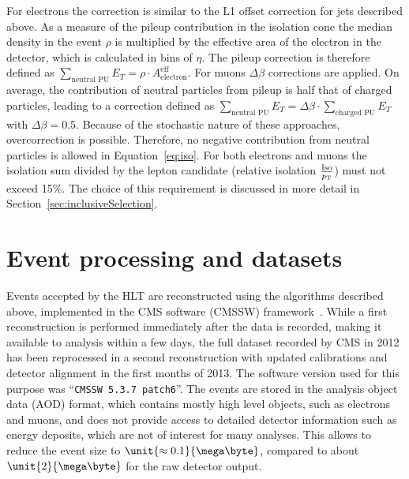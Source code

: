 For electrons the correction is similar to the L1 offset correction for jets described above. As a measure of the pileup contribution in the isolation cone the median \pt density in the event $\rho$ is multiplied by the effective area of the electron in the detector, which is calculated in bins of $\eta$. The pileup correction is therefore defined as $\sum\limits_{\text{neutral PU}} E_T = \rho\cdot A^{\text{eff}}_{\text{electron}}$. For muons $\Delta \beta$ corrections are applied. On average, the contribution of neutral particles from pileup is half that of charged particles, leading to a correction defined as $\sum\limits_{\text{neutral PU}} E_T = \Delta\beta\cdot \sum\limits_{\text{charged PU}} E_T$ with $\Delta\beta = 0.5$. Because of the stochastic nature of these approaches, overcorrection is possible. Therefore, no negative contribution from neutral particles is allowed in Equation~\ref{eq:iso}. For both electrons and muons the isolation sum divided by the lepton candidate \pt (relative isolation $\frac{\text{Iso}}{p_{\mathrm{T}}}$) must not exceed  15\%. The choice of this requirement is discussed in more detail in Section~\ref{sec:inclusiveSelection}.

 
\section{Event processing and datasets}
Events accepted by the HLT are reconstructed using the algorithms described above, implemented in the CMS software (CMSSW) framework~\cite{PTDR1,SWGuideCMSSW}. While a first reconstruction is performed immediately after the data is recorded, making it available to analysis within a few days, the full dataset recorded by CMS in 2012 has been reprocessed in a second reconstruction with updated calibrations and detector alignment in the first months of 2013. The software version used for this purpose was ``\verb+CMSSW 5.3.7 patch6+''. The events are stored in the analysis object data (AOD) format, which contains mostly high level objects, such as electrons and muons, and does not provide access to detailed detector information such as energy deposits, which are not of interest for many analyses. This allows to reduce the event size to $\unit{\approx0.1}{\mega\byte}$, compared to about $\unit{2}{\mega\byte}$ for the raw detector output. 

